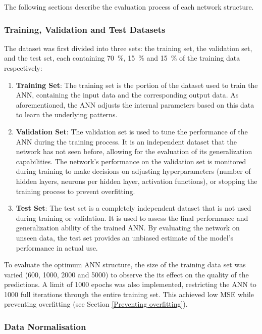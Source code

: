 The following sections describe the evaluation process of each network structure.

\subsubsection{Training, Validation and Test Datasets}

The dataset was first divided into three sets: the training set, the validation set, and the test set, each containing 70~$\%$, 15~$\%$ and 15~$\%$ of the training data respectively:

\begin{enumerate}
	\item \textbf{Training Set}: The training set is the portion of the dataset used to train the ANN, containing the input data and the corresponding output data. As aforementioned, the ANN adjusts the internal parameters based on this data to learn the underlying patterns.
	\item \textbf{Validation Set}: The validation set is used to tune the performance of the ANN during the training process. It is an independent dataset that the network has not seen before, allowing for the evaluation of its generalization capabilities. The network's performance on the validation set is monitored during training to make decisions on adjusting hyperparameters (number of hidden layers, neurons per hidden layer, activation functions), or stopping the training process to prevent overfitting.
	\item \textbf{Test Set}: The test set is a completely independent dataset that is not used during training or validation. It is used to assess the final performance and generalization ability of the trained ANN. By evaluating the network on unseen data, the test set provides an unbiased estimate of the model's performance in actual use.
\end{enumerate}

To evaluate the optimum ANN structure, the size of the training data set was varied (600, 1000, 2000 and 5000) to observe the its effect on the quality of the predictions. A limit of 1000 epochs was also implemented, restricting the ANN to 1000 full iterations through the entire training set. This achieved low MSE while preventing overfitting (see Section \ref{Preventing overfitting}).

\subsubsection{Data Normalisation}

